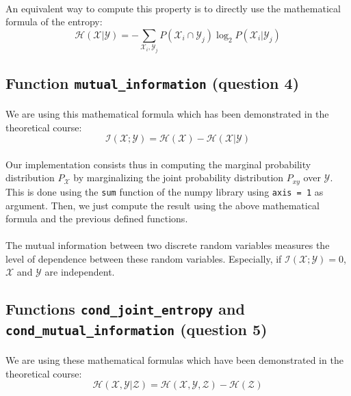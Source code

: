 \documentclass[a4paper, 11pt, oneside]{article}
\begin{document}
\paragraph{}An equivalent way to compute this property is to directly use the mathematical formula of the entropy:
$$ \mathcal{H}(\mathcal{X} | \mathcal{Y}) = - \sum_{\mathcal{X}_i, \mathcal{Y}_j} P(\mathcal{X}_i \cap \mathcal{Y}_j) \log_2{P(\mathcal{X}_i | \mathcal{Y}_j)} $$

\subsection{Function \texttt{mutual\_information} (question 4)}

\paragraph{}We are using this mathematical formula which has been demonstrated in the theoretical course: 
$$ \mathcal{I}(\mathcal{X}; \mathcal{Y}) = \mathcal{H}(\mathcal{X}) - \mathcal{H}(\mathcal{X}| \mathcal{Y})$$

\paragraph{}Our implementation consists thus in computing the marginal probability distribution $P_\mathcal{X}$ by marginalizing the joint probability distribution $P_{xy}$ over $\mathcal{Y}$. This is done using the \texttt{sum} function of the numpy library using \texttt{axis = 1} as argument. Then, we just compute the result using the above mathematical formula and the previous defined functions.

\paragraph{}The mutual information between two discrete random variables measures the level of dependence between these random variables. Especially, if $\mathcal{I}(\mathcal{X}; \mathcal{Y}) = 0$, $\mathcal{X}$ and $\mathcal{Y}$ are independent.

\subsection{Functions \texttt{cond\_joint\_entropy} and \texttt{cond\_mutual\_information} (question 5)}

\paragraph{}We are using these mathematical formulas which have been demonstrated in the theoretical course: 
$$ \mathcal{H}(\mathcal{X}, \mathcal{Y} | \mathcal{Z}) = \mathcal{H}(\mathcal{X}, \mathcal{Y}, \mathcal{Z}) - \mathcal{H}(\mathcal{Z})$$
\end{document}
